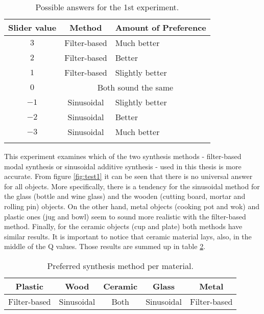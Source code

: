 \begin{table}[ht]
	\centering
    \begin{tabular}{ c  c  l  }
    \toprule
    \textbf{Slider value} & \textbf{Method} & \textbf{Amount of Preference} \\ \toprule
    \addlinespace
    $3$ & Filter-based & Much better  \\
    $2$ & Filter-based & Better \\
    $1$ & Filter-based & Slightly better \\ 
    \addlinespace
    $0$ & \multicolumn{2}{c}{Both sound the same} \\
    \addlinespace
    $-1$ & Sinusoidal & Slightly better \\ 
    $-2$ & Sinusoidal & Better \\ 
    $-3$ & Sinusoidal & Much better \\
    \addlinespace
    \bottomrule
    \end{tabular}
    \caption{Possible answers for the 1st experiment.}
    \label{tab:test1_ans}
\end{table}  

This experiment examines which of the two synthesis methods - filter-based modal synthesis or sinusoidal additive synthesis - used in this thesis is more accurate. From figure \ref{fig:test1} it can be seen that there is no universal answer for all objects. More specifically, there is a tendency for the sinusoidal method for the glass (bottle and wine glass) and the wooden (cutting board, mortar and rolling pin) objects. On the other hand, metal objects (cooking pot and wok) and plastic ones (jug and bowl) seem to sound more realistic with the filter-based method. Finally, for the ceramic objects (cup and plate) both methods have similar results. It is important to notice that ceramic material lays, also, in the middle of the \gls{Q} values. Those results are summed up in table \ref{tab:method_mat}.

\begin{table}[H]
	\centering
    \begin{tabular}{ c  c  c c c }
    \toprule
    \textbf{Plastic} & \textbf{Wood} & \textbf{Ceramic} & \textbf{Glass} & \textbf{Metal} \\ \toprule
    Filter-based & Sinusoidal & Both & Sinusoidal & Filter-based  \\
    \bottomrule
    \end{tabular}
    \caption{Preferred synthesis method per material.}
    \label{tab:method_mat}
\end{table} 

